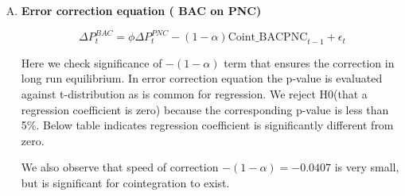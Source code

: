 \documentclass[a4paper, 11pt]{article}
\begin{document}
\begin{enumerate}[A.]
Notes: \newline
 [1] R² is computed without centering (uncentered) since the model does not contain a constant. \newline
 [2] Standard Errors assume that the covariance matrix of the errors is correctly specified.\\

\item
\textbf{Error correction equation ( BAC on PNC)}

$$\Delta P^{BAC}_t = \phi \Delta P^{PNC}_{t} - (1-\alpha) \text{Coint\_BACPNC}_{t-1} + \epsilon_t$$  

Here we check significance of  $-(1- \alpha) $ term that ensures the correction in long run equilibrium. In error correction equation the  p-value is evaluated against t-distribution as is common for regression. We reject  H0(that a regression coefficient is zero) because the corresponding  p-value is less than 5\%. Below table indicates regression coefficient is significantly different from zero.

We also observe that speed of correction $-(1- \alpha) = -0.0407$ is very small, but is significant for cointegration to exist.


\end{enumerate}
\end{document}
